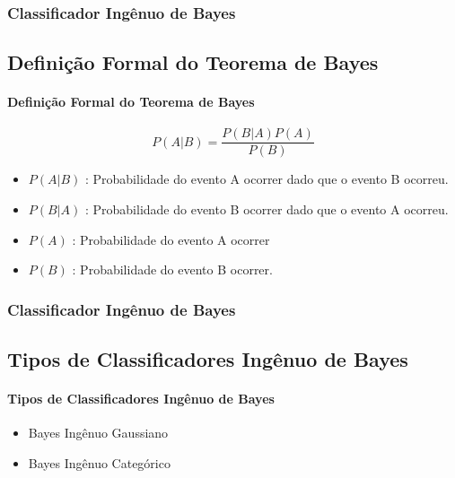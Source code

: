 \documentclass{beamer}
\begin{document}
\begin{frame}
\frametitle{Classificador Ingênuo de Bayes}
\subsection{Definição Formal do Teorema de Bayes}
\framesubtitle{Definição Formal do Teorema de Bayes}
\begin{equation}
    P(A|B) = \frac{P(B|A)P(A)}{P(B)}
\end{equation}

\begin{itemize}
\item $P(A|B)$ : Probabilidade do evento A ocorrer dado que o evento B ocorreu.
\item $P(B|A)$ : Probabilidade do evento B ocorrer dado que o evento A ocorreu.
\item $P(A)$   : Probabilidade do evento A ocorrer
\item $P(B)$   : Probabilidade do evento B ocorrer. 
\end{itemize}

\end{frame}

\begin{frame}
\frametitle{Classificador Ingênuo de Bayes}
\subsection{Tipos de Classificadores Ingênuo de Bayes}
\framesubtitle{Tipos de Classificadores Ingênuo de Bayes}
\begin{itemize}
\item Bayes Ingênuo Gaussiano
\item Bayes Ingênuo Categórico
\end{itemize}
\end{frame}
\end{document}
